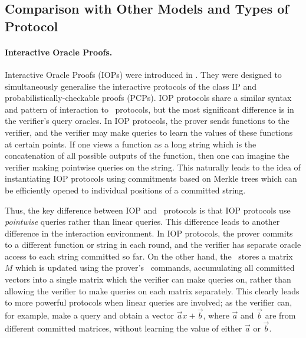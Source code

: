 \subsection{Comparison with Other Models and Types of Protocol}

\paragraph{Interactive Oracle Proofs.} Interactive Oracle Proofs (IOPs) were introduced in \cite{Ben-SassonCS16}. They were designed to simultaneously generalise the interactive protocols of the class IP and probabilistically-checkable proofs (PCPs). IOP protocols share a similar syntax and pattern of interaction to \ILC\ protocols, but the most significant difference is in the verifier's query oracles. In IOP protocols, the prover sends functions to the verifier, and the verifier may make queries to learn the values of these functions at certain points. If one views a function as a long string which is the concatenation of all possible outputs of the function, then one can imagine the verifier making pointwise queries on the string. This naturally leads to the idea of instantiating IOP protocols using commitments based on Merkle trees \cite{Ben-SassonBHR18} which can be efficiently opened to individual positions of a committed string.

Thus, the key difference between IOP and \ILC\ protocols is that IOP protocols use \emph{pointwise} queries rather than linear queries. This difference leads to another difference in the interaction environment. In IOP protocols, the prover commits to a different function or string in each round, and the verifier has separate oracle access to each string committed so far. On the other hand, the \ILC\ stores a matrix $M$ which is updated using the prover's \ILCcommit\ commands, accumulating all committed vectors into a single matrix which the verifier can make queries on, rather than allowing the verifier to make queries on each matrix separately. This clearly leads to more powerful protocols when linear queries are involved; as the verifier can, for example, make a query and obtain a vector $\vec{a}x+\vec{b}$, where $\vec{a}$ and $\vec{b}$ are from different committed matrices, without learning the value of either $\vec{a}$ or $\vec{b}$.

